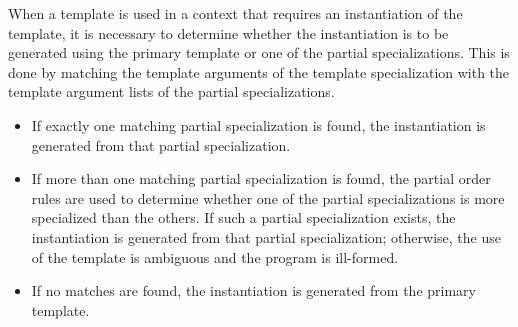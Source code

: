 \pnum
When a template is used in a context that requires an instantiation of
the template,
it is necessary to determine whether the instantiation is to be generated
using the primary template or one of the partial specializations.
This is done by matching the template arguments of the template
specialization with the template argument lists of the partial
specializations.

\begin{itemize}
\item
If exactly one matching partial specialization is found, the instantiation is
generated from that partial specialization.
\item
If more than one matching partial specialization is found,
the partial order rules are used to determine
whether one of the partial specializations is more specialized than the
others.
If such a partial specialization exists,
the instantiation is generated from that partial specialization;
otherwise, the use of the template is ambiguous and the program is ill-formed.
\item
If no matches are found, the instantiation is generated from the
primary template.
\end{itemize}

